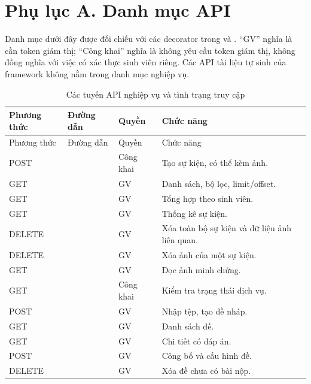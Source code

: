 \chapter*{Phụ lục A. Danh mục API}
\setcounter{table}{0}
\renewcommand{\theHtable}{appendixA.\arabic{table}}
\setcounter{lstlisting}{0}
Danh mục dưới đây được đối chiếu với các decorator trong  và . ``GV'' nghĩa là cần token giám thị; ``Công khai'' nghĩa là không yêu cầu token giám thị, không đồng nghĩa với việc có xác thực sinh viên riêng. Các API tài liệu tự sinh của framework không nằm trong danh mục nghiệp vụ.

\begin{longtable}{@{}L{1.9cm}L{6.9cm}L{1.8cm}L{3.9cm}@{}}
\caption{Các tuyến API nghiệp vụ và tình trạng truy cập}\\
\toprule Phương thức & Đường dẫn & Quyền & Chức năng \\\midrule\endfirsthead
\toprule Phương thức & Đường dẫn & Quyền & Chức năng \\\midrule\endhead
POST &  & Công khai & Tạo sự kiện, có thể kèm ảnh.\\
GET &  & GV & Danh sách, bộ lọc, limit/offset.\\
GET &  & GV & Tổng hợp theo sinh viên.\\
GET &  & GV & Thống kê sự kiện.\\
DELETE &  & GV & Xóa toàn bộ sự kiện và dữ liệu ảnh liên quan.\\
DELETE &  & GV & Xóa ảnh của một sự kiện.\\
GET &  & GV & Đọc ảnh minh chứng.\\
GET &  & Công khai & Kiểm tra trạng thái dịch vụ.\\
POST &  & GV & Nhập tệp, tạo đề nháp.\\
GET &  & GV & Danh sách đề.\\
GET &  & GV & Chi tiết có đáp án.\\
POST &  & GV & Công bố và cấu hình đề.\\
DELETE &  & GV & Xóa đề chưa có bài nộp.\\

\end{longtable}
